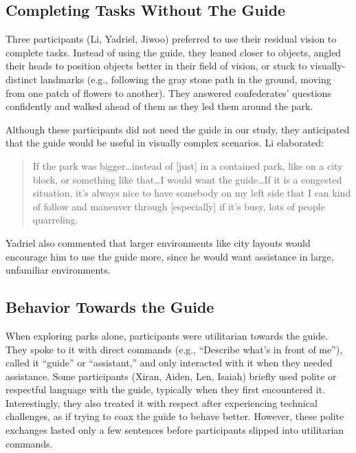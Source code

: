 \subsection{Completing Tasks Without The Guide} \label{sec: Completing Tasks Without The Guide}

Three participants (Li, Yadriel, Jiwoo) preferred to use their residual vision to complete tasks. Instead of using the guide, they leaned closer to objects, angled their heads to position objects better in their field of vision, or stuck to visually-distinct landmarks (e.g., following the gray stone path in the ground, moving from one patch of flowers to another). They answered confederates’ questions confidently and walked ahead of them as they led them around the park.

Although these participants did not need the guide in our study, they anticipated that the guide would be useful in visually complex scenarios. Li elaborated:

\begin{quote}
If the park was bigger…instead of [just] in a contained park, like on a city block, or something like that…I would want the guide…If it is a congested situation, it's always nice to have somebody on my left side that I can kind of follow and maneuver through [especially] if it's busy, lots of people quarreling.
\end{quote}

Yadriel also commented that larger environments like city layouts would encourage him to use the guide more, since he would want assistance in large, unfamiliar environments.

\subsection{Behavior Towards the Guide} \label{sec: Behavior Towards the Guide}

When exploring parks alone, participants were utilitarian towards the guide. They spoke to it with direct commands (e.g., “Describe what’s in front of me”), called it “guide” or “assistant,” and only interacted with it when they needed assistance. Some participants (Xiran, Aiden, Len, Isaiah) briefly used polite or respectful language with the guide, typically when they first encountered it. Interestingly, they also treated it with respect after experiencing technical challenges, as if trying to coax the guide to behave better. However, these polite exchanges lasted only a few sentences before participants slipped into utilitarian commands.

